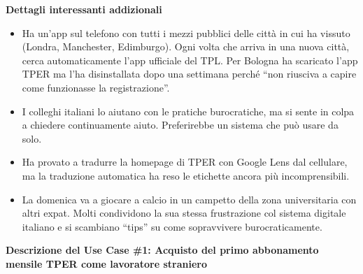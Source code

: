 \documentclass[11pt,a4paper]{article}
\begin{document}
\vspace{0.3cm}


\begin{tcolorbox}[colback=backgroundColor!50,colframe=borderColor,arc=2mm]
    \textbf{Dettagli interessanti addizionali} \\[4pt]
    {\small
    \begin{itemize}[leftmargin=*]
        \item Ha un'app sul telefono con tutti i mezzi pubblici delle citt\`a in cui ha vissuto (Londra, Manchester, Edimburgo). Ogni volta che arriva in una nuova citt\`a, cerca automaticamente l'app ufficiale del TPL. Per Bologna ha scaricato l'app TPER ma l'ha disinstallata dopo una settimana perch\'e ``non riusciva a capire come funzionasse la registrazione''.
        \item I colleghi italiani lo aiutano con le pratiche burocratiche, ma si sente in colpa a chiedere continuamente aiuto. Preferirebbe un sistema che pu\`o usare da solo.
        \item Ha provato a tradurre la homepage di TPER con Google Lens dal cellulare, ma la traduzione automatica ha reso le etichette ancora pi\`u incomprensibili.
        \item La domenica va a giocare a calcio in un campetto della zona universitaria con altri expat. Molti condividono la sua stessa frustrazione col sistema digitale italiano e si scambiano ``tips'' su come sopravvivere burocraticamente.
    \end{itemize}
    }
\end{tcolorbox}

\newpage


\begin{tcolorbox}[colback=primaryColor!10,colframe=primaryColor,arc=2mm]
    \textbf{Descrizione del Use Case \#1: Acquisto del primo abbonamento mensile TPER come lavoratore straniero}
\end{tcolorbox}
\end{document}
